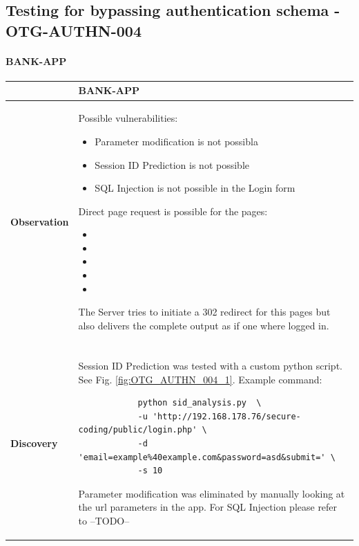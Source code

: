 \subsection{Testing for bypassing authentication schema - OTG-AUTHN-004}
\paragraph{BANK-APP} \mbox{}
\begin{longtable*}{p{.20\textwidth} | p{.80\textwidth}}
    \hline
    & \textbf{BANK-APP} \\ 
    \hline
    \textbf{Observation} &
    	Possible vulnerabilities:
        \begin{itemize}
		  \item Parameter modification is not possibla
		  \item Session ID Prediction is not possible
		  \item SQL Injection is not possible in the Login form
		\end{itemize}
		Direct page request is possible for the pages:
		\begin{itemize}
		  \item {}
		  \item {}
		  \item {}
		  \item {}
		  \item {}
		\end{itemize}
		The Server tries to initiate a 302 redirect for this pages but also delivers the complete output as if one where logged in.
    \\\\
    \textbf{Discovery} &
        Session ID Prediction was tested with a custom python script. See Fig. \ref{fig:OTG_AUTHN_004_1}. Example command:
        \begin{lstlisting}
			python sid_analysis.py  \
			-u 'http://192.168.178.76/secure-coding/public/login.php' \
			-d 'email=example%40example.com&password=asd&submit=' \ 
			-s 10
		\end{lstlisting}
        Parameter modification was eliminated by manually looking at the url parameters in the app. \newline
        For SQL Injection please refer to --TODO-- \newline

\end{longtable*}
